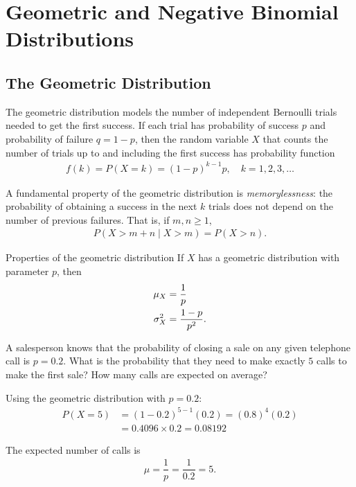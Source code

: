 \section{Geometric and Negative Binomial Distributions}
\subsection{The Geometric Distribution}

The geometric distribution models the number of independent Bernoulli trials needed to get the first success. If each trial has probability of success $p$ and probability of failure $q=1-p$, then the random variable $X$ that counts the number of trials up to and including the first success has probability function
\begin{align}
 \label{eq:2.10.9}
 f(k) = P(X=k) = (1-p)^{k-1}p, \quad k=1,2,3,\dots
\end{align}

A fundamental property of the geometric distribution is \emph{memorylessness}: the probability of obtaining a success in the next $k$ trials does not depend on the number of previous failures. That is, if $m,n\geq 1$,
\begin{align}
 P(X > m+n \mid X > m) = P(X > n).
\end{align}

{Properties of the geometric distribution} If $X$ has a geometric distribution with parameter $p$, then
\begin{align}
 \mu_{X} &= \dfrac{1}{p} \\
 \sigma_{X}^{2} &= \dfrac{1-p}{p^{2}}.
\end{align}

\begin{ejemplo}
 \label{exmp:2.10.13}
 A salesperson knows that the probability of closing a sale on any given telephone call is $p=0.2$. What is the probability that they need to make exactly $5$ calls to make the first sale? How many calls are expected on average?
\end{ejemplo}

\begin{solucion}
	Using the geometric distribution with $p=0.2$:
	\begin{align}
		P(X=5) &= (1-0.2)^{5-1}(0.2) = (0.8)^{4}(0.2) \\
		&= 0.4096 \times 0.2 = 0.08192
	\end{align}

	The expected number of calls is
	\begin{align}
		\mu = \dfrac{1}{p} = \dfrac{1}{0.2} = 5.
	\end{align}
\end{solucion}

